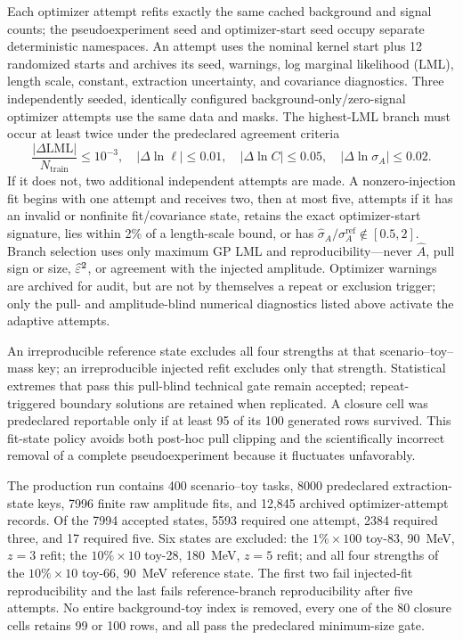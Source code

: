 Each optimizer attempt refits exactly the same cached background and signal counts;
the pseudoexperiment seed and optimizer-start seed occupy separate deterministic
namespaces.  An attempt uses the nominal kernel start plus 12 randomized starts and
archives its seed, warnings, log marginal likelihood (LML), length scale, constant,
extraction uncertainty, and covariance diagnostics.  Three independently seeded,
identically configured background-only/zero-signal optimizer attempts use the same
data and masks.  The highest-LML branch
must occur at least twice under the predeclared agreement criteria
\begin{equation}
 \frac{|\Delta\mathrm{LML}|}{N_{\mathrm{train}}}\leq10^{-3},\quad
 |\Delta\ln\ell|\leq0.01,\quad
 |\Delta\ln C|\leq0.05,\quad
 |\Delta\ln\sigma_A|\leq0.02.
 \label{eq:v4p6-branch-replication}
\end{equation}
If it does not, two additional independent attempts are made.  A nonzero-injection
fit begins with one attempt and receives two, then at most five, attempts if it has an
invalid or nonfinite fit/covariance state, retains the exact optimizer-start signature, lies
within 2\% of a length-scale bound, or has
$\widehat\sigma_A/\sigma_A^{\mathrm{ref}}\notin[0.5,2]$.  Branch selection uses only
maximum GP LML and reproducibility---never $\widehat A$, pull sign or size,
$\widehat{\varepsilon}^2$, or agreement with the injected amplitude.
Optimizer warnings are archived for audit, but are not by themselves a repeat or
exclusion trigger; only the pull- and amplitude-blind numerical diagnostics listed above
activate the adaptive attempts.

An irreproducible reference state excludes all four strengths at that
scenario--toy--mass key; an irreproducible injected refit excludes only that strength.
Statistical extremes that pass this pull-blind technical gate remain accepted;
repeat-triggered boundary solutions are retained when replicated.  A closure cell
was predeclared reportable only if at least 95 of its 100 generated rows survived.
This fit-state policy avoids both post-hoc pull clipping and the scientifically
incorrect removal of a complete pseudoexperiment because it fluctuates unfavorably.

The production run contains 400 scenario--toy tasks, 8000 predeclared extraction-state
keys, 7996 finite raw amplitude fits, and 12,845 archived optimizer-attempt records.
Of the 7994 accepted states,
5593 required one attempt, 2384 required three, and 17 required five.  Six states are
excluded: the $1\%\times100$ toy-83, 90~MeV, $z=3$ refit; the $10\%\times10$
toy-28, 180~MeV, $z=5$ refit; and all four strengths of the $10\%\times10$ toy-66,
90~MeV reference state.  The first two fail injected-fit reproducibility and the last
fails reference-branch reproducibility after five attempts.  No entire background-toy
index is removed, every one of the 80 closure cells retains 99 or 100 rows, and all pass the
predeclared minimum-size gate.

